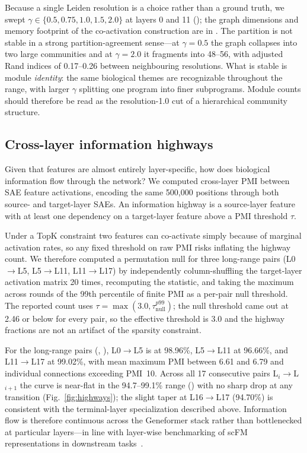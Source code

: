 Because a single Leiden resolution is a choice rather than a ground truth, we swept
$\gamma \in \{0.5, 0.75, 1.0, 1.5, 2.0\}$ at layers 0 and 11 (); the graph
dimensions and memory footprint of the co-activation construction are in . The partition is not stable in a
strong partition-agreement sense---at $\gamma{=}0.5$ the graph collapses into two large
communities and at $\gamma{=}2.0$ it fragments into 48--56, with adjusted Rand indices of 0.17--0.26
between neighbouring resolutions. What is stable is module \emph{identity}: the same biological
themes are recognizable throughout the range, with larger $\gamma$ splitting one program into
finer subprograms. Module counts should therefore be read as the resolution-1.0 cut of a
hierarchical community structure.

\subsection*{Cross-layer information highways}
\label{sec:highways}

Given that features are almost entirely layer-specific, how does biological information flow
through the network? We computed cross-layer PMI between SAE feature activations, encoding the same
500,000 positions through both source- and target-layer SAEs. An information highway is a
source-layer feature with at least one dependency on a target-layer feature above a PMI threshold
$\tau$.

Under a TopK constraint two features can co-activate simply because of marginal activation rates,
so any fixed threshold on raw PMI risks inflating the highway count. We therefore computed a
permutation null for three long-range pairs (L0$\to$L5, L5$\to$L11, L11$\to$L17) by independently
column-shuffling the target-layer activation matrix 20 times, recomputing the statistic, and taking
the maximum across rounds of the 99th percentile of finite PMI as a per-pair null threshold. The
reported count uses $\tau = \max(3.0, \tau_{\text{null}}^{p99})$; the null threshold came out at
2.46 or below for every pair, so the effective threshold is 3.0 and the highway fractions are not
an artifact of the sparsity constraint.

For the long-range pairs (, ), L0$\to$L5 is at 98.96\%,
L5$\to$L11 at 96.66\%, and L11$\to$L17 at 99.02\%, with mean maximum PMI between 6.61 and 6.79 and individual connections exceeding PMI~10.
Across all 17 consecutive pairs L$_{i}$$\to$L$_{i+1}$ the curve is near-flat in the 94.7--99.1\%
range () with no sharp drop at any transition (Fig.~\ref{fig:highways}); the slight taper at
L16$\to$L17 (94.70\%) is consistent with the terminal-layer specialization described above.
Information flow is therefore continuous across the Geneformer stack rather than bottlenecked at
particular layers---in line with layer-wise benchmarking of scFM representations in downstream
tasks~\cite{wang2025scdrugmap}.

